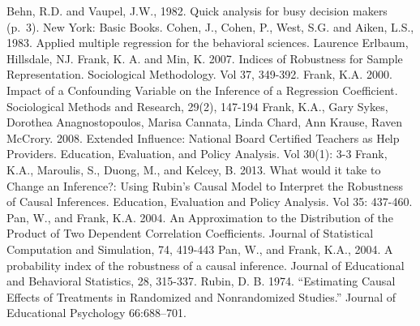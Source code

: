 \documentclass[man]{apa6}
\theoremstyle{definition}
\theoremstyle{definition}
\theoremstyle{definition}
\theoremstyle{remark}
\begin{document}
Behn, R.D. and Vaupel, J.W., 1982. Quick analysis for busy decision
makers (p.~3). New York: Basic Books. Cohen, J., Cohen, P., West, S.G.
and Aiken, L.S., 1983. Applied multiple regression for the behavioral
sciences. Laurence Erlbaum, Hillsdale, NJ. Frank, K. A. and Min, K.
2007. Indices of Robustness for Sample Representation. Sociological
Methodology. Vol 37, 349-392. Frank, K.A. 2000. Impact of a Confounding
Variable on the Inference of a Regression Coefficient. Sociological
Methods and Research, 29(2), 147-194 Frank, K.A., Gary Sykes, Dorothea
Anagnostopoulos, Marisa Cannata, Linda Chard, Ann Krause, Raven McCrory.
2008. Extended Influence: National Board Certified Teachers as Help
Providers. Education, Evaluation, and Policy Analysis. Vol 30(1): 3-3
Frank, K.A., Maroulis, S., Duong, M., and Kelcey, B. 2013. What would it
take to Change an Inference?: Using Rubin's Causal Model to Interpret
the Robustness of Causal Inferences. Education, Evaluation and Policy
Analysis. Vol 35: 437-460. Pan, W., and Frank, K.A. 2004. An
Approximation to the Distribution of the Product of Two Dependent
Correlation Coefficients. Journal of Statistical Computation and
Simulation, 74, 419-443 Pan, W., and Frank, K.A., 2004. A probability
index of the robustness of a causal inference. Journal of Educational
and Behavioral Statistics, 28, 315-337. Rubin, D. B. 1974.
\enquote{Estimating Causal Effects of Treatments in Randomized and
Nonrandomized Studies.} Journal of Educational Psychology 66:688--701.
\end{document}
